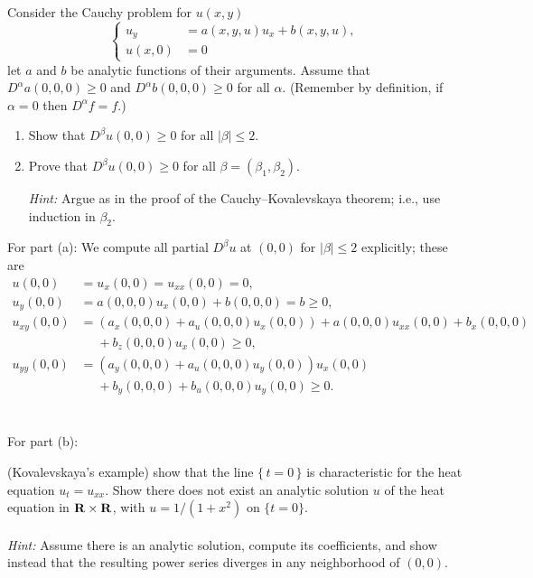 \begin{problem}
  Consider the Cauchy problem for \(u(x,y)\)
  \[
    \left\{
      \begin{aligned}
        u_y&=a(x, y, u)u_x+b(x,y,u),\\
        u(x,0)&=0
      \end{aligned}
    \right.
  \]
  let \(a\) and \(b\) be analytic functions of their arguments. Assume that
  \(D^\alpha a(0,0,0)\geq 0\) and \(D^\alpha b(0,0,0)\geq 0\) for all
  \(\alpha\). (Remember by definition, if \(\alpha=0\) then
  \(D^\alpha f=f\).)
  \begin{enumerate}[label=(\alph*),noitemsep]
  \item Show that \(D^\beta u(0,0)\geq 0\) for all \(|\beta|\leq 2\).
  \item Prove that \(D^\beta u(0,0)\geq 0\) for all
    \(\beta=(\beta_1,\beta_2)\).

    \noindent \emph{Hint:} Argue as in the proof of the
    Cauchy--Kovalevskaya theorem; i.e., use induction in \(\beta_2\).
  \end{enumerate}
\end{problem}
\begin{solution*}
  For part (a): We compute all partial \(D^\beta u\) at \((0,0)\) for
  \(|\beta|\leq 2\) explicitly; these are
  \begin{align*}
    u(0,0)&=u_x(0,0)=u_{xx}(0,0)=0,\\
    u_y(0,0)&=a(0,0,0)u_x(0,0)+b(0,0,0)=b\geq 0,\\
    u_{xy}(0,0)&=(a_x(0,0,0)+a_u(0,0,0)u_x(0,0))+a(0,0,0)u_{xx}(0,0)+b_x(0,0,0)\\
          &\phantom{{}={}}+b_z(0,0,0)u_x(0,0)\geq 0,\\
    u_{yy}(0,0)&=(a_y(0,0,0)+a_u(0,0,0)u_y(0,0))u_x(0,0)\\
               &\phantom{{}={}}+b_y(0,0,0)+b_u(0,0,0)u_y(0,0)\geq 0.
  \end{align*}
  \\\\
  For part (b):
\end{solution*}

\begin{problem}
  (Kovalevskaya's example) show that the line \(\{\,t=0\,\}\) is
  characteristic for the heat equation \(u_t=u_{xx}\). Show there does not
  exist an analytic solution \(u\) of the heat equation in
  \(\mathbf{R}\times\mathbf{R}\), with \(u=1/(1+x^2)\) on \(\{t=0\}\).
  \\\\
  \emph{Hint:} Assume there is an analytic solution, compute its
  coefficients, and show instead that the resulting power series diverges
  in any neighborhood of \((0,0)\).
\end{problem}
\begin{solution*}
\end{solution*}

